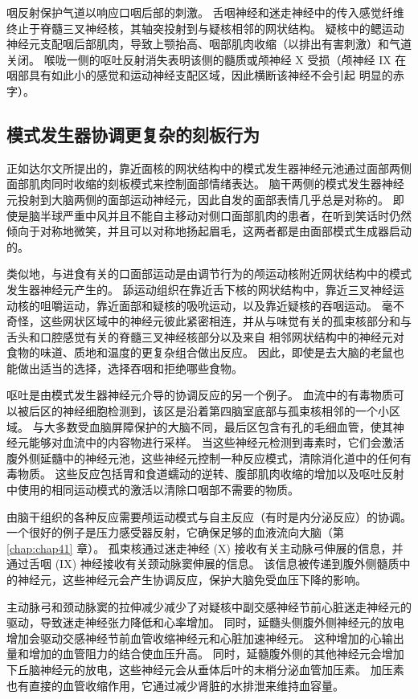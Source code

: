 咽反射保护气道以响应口咽后部的刺激。 舌咽神经和迷走神经中的传入感觉纤维终止于脊髓三叉神经核，其轴突投射到与疑核相邻的网状结构。 疑核中的鳃运动神经元支配咽后部肌肉，导致上颚抬高、咽部肌肉收缩（以排出有害刺激）和气道关闭。 喉咙一侧的呕吐反射消失表明该侧的髓质或颅神经 X 受损（颅神经 IX 在咽部具有如此小的感觉和运动神经支配区域，因此横断该神经不会引起 明显的赤字）。

\subsection{模式发生器协调更复杂的刻板行为}
正如达尔文所提出的，靠近面核的网状结构中的模式发生器神经元池通过面部两侧面部肌肉同时收缩的刻板模式来控制面部情绪表达。 脑干两侧的模式发生器神经元投射到大脑两侧的面部运动神经元，因此自发的面部表情几乎总是对称的。 即使是脑半球严重中风并且不能自主移动对侧口面部肌肉的患者，在听到笑话时仍然倾向于对称地微笑，并且可以对称地扬起眉毛，这两者都是由面部模式生成器启动的。

类似地，与进食有关的口面部运动是由调节行为的颅运动核附近网状结构中的模式发生器神经元产生的。 舔运动组织在靠近舌下核的网状结构中，靠近三叉神经运动核的咀嚼运动，靠近面部和疑核的吸吮运动，以及靠近疑核的吞咽运动。 毫不奇怪，这些网状区域中的神经元彼此紧密相连，并从与味觉有关的孤束核部分和与舌头和口腔感觉有关的脊髓三叉神经核部分以及来自 相邻网状结构中的神经元对食物的味道、质地和温度的更复杂组合做出反应。 因此，即使是去大脑的老鼠也能做出适当的选择，选择吞咽和拒绝哪些食物。

呕吐是由模式发生器神经元介导的协调反应的另一个例子。 血流中的有毒物质可以被后区的神经细胞检测到，该区是沿着第四脑室底部与孤束核相邻的一个小区域。 与大多数受血脑屏障保护的大脑不同，最后区包含有孔的毛细血管，使其神经元能够对血流中的内容物进行采样。 当这些神经元检测到毒素时，它们会激活腹外侧延髓中的神经元池，这些神经元控制一种反应模式，清除消化道中的任何有毒物质。 这些反应包括胃和食道蠕动的逆转、腹部肌肉收缩的增加以及呕吐反射中使用的相同运动模式的激活以清除口咽部不需要的物质。

由脑干组织的各种反应需要颅运动模式与自主反应（有时是内分泌反应）的协调。 一个很好的例子是压力感受器反射，它确保足够的血液流向大脑（第 \ref{chap:chap41} 章）。 孤束核通过迷走神经 (X) 接收有关主动脉弓伸展的信息，并通过舌咽 (IX) 神经接收有关颈动脉窦伸展的信息。 该信息被传递到腹外侧髓质中的神经元，这些神经元会产生协调反应，保护大脑免受血压下降的影响。

主动脉弓和颈动脉窦的拉伸减少减少了对疑核中副交感神经节前心脏迷走神经元的驱动，导致迷走神经张力降低和心率增加。 同时，延髓头侧腹外侧神经元的放电增加会驱动交感神经节前血管收缩神经元和心脏加速神经元。 这种增加的心输出量和增加的血管阻力的结合使血压升高。 同时，延髓腹外侧的其他神经元会增加下丘脑神经元的放电，这些神经元会从垂体后叶的末梢分泌血管加压素。 加压素也有直接的血管收缩作用，它通过减少肾脏的水排泄来维持血容量。

